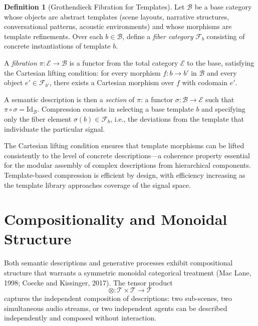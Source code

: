 \documentclass[11pt,a4paper]{article}
\theoremstyle{definition}
\newtheorem{definition}[theorem]{Definition}
\theoremstyle{remark}
\begin{document}
\begin{definition}[Grothendieck Fibration for Templates]
Let $\mathcal{B}$ be a base category whose objects are abstract templates (scene layouts, narrative structures, conversational patterns, acoustic environments) and whose morphisms are template refinements. Over each $b \in \mathcal{B}$, define a \emph{fiber category} $\mathcal{F}_b$ consisting of concrete instantiations of template $b$.

A \emph{fibration} $\pi : \mathcal{E} \rightarrow \mathcal{B}$ is a functor from the total category $\mathcal{E}$ to the base, satisfying the Cartesian lifting condition: for every morphism $f : b \rightarrow b'$ in $\mathcal{B}$ and every object $e' \in \mathcal{F}_{b'}$, there exists a Cartesian morphism over $f$ with codomain $e'$.
\end{definition}

A semantic description is then a \emph{section} of $\pi$: a functor $\sigma : \mathcal{B} \rightarrow \mathcal{E}$ such that $\pi \circ \sigma = \mathrm{Id}_\mathcal{B}$. Compression consists in selecting a base template $b$ and specifying only the fiber element $\sigma(b) \in \mathcal{F}_b$, i.e., the deviations from the template that individuate the particular signal.

The Cartesian lifting condition ensures that template morphisms can be lifted consistently to the level of concrete descriptions---a coherence property essential for the modular assembly of complex descriptions from hierarchical components. Template-based compression is efficient by design, with efficiency increasing as the template library approaches coverage of the signal space.

\section{Compositionality and Monoidal Structure}
\label{sec:monoidal}

Both semantic descriptions and generative processes exhibit compositional structure that warrants a symmetric monoidal categorical treatment (Mac Lane, 1998; Coecke and Kissinger, 2017). The tensor product
\[
\otimes : \mathcal{T} \times \mathcal{T} \rightarrow \mathcal{T}
\]
captures the independent composition of descriptions: two sub-scenes, two simultaneous audio streams, or two independent agents can be described independently and composed without interaction.
\end{document}
